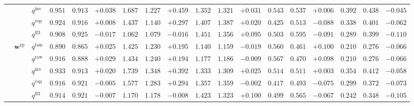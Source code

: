 \documentclass[eng]{kjas3}
\begin{document}
\begin{table}[t]
{\begin{tabular}{lll ccc ccc ccc ccc ccc}
 &  & $q^{\mathrm{inv}}$ & $0.951$ & $0.913$ & \cellcolor{posgreen!50}$+0.038$ & $1.687$ & $1.227$ & \cellcolor{posgreen!50}$+0.459$ & $1.352$ & $1.321$ & \cellcolor{posgreen!50}$+0.031$ & $0.543$ & $0.537$ & \cellcolor{posgreen!50}$+0.006$ & $0.392$ & $0.438$ & \cellcolor{negred!50}$-0.045$ \\
 &  & $q^{\mathrm{vsp}}$ & $0.924$ & $0.916$ & \cellcolor{posgreen!50}$+0.008$ & $1.437$ & $1.140$ & \cellcolor{posgreen!50}$+0.297$ & $1.407$ & $1.387$ & \cellcolor{posgreen!50}$+0.020$ & $0.425$ & $0.513$ & \cellcolor{negred!50}$-0.088$ & $0.338$ & $0.401$ & \cellcolor{negred!50}$-0.062$ \\
 &  & $q^{\mathrm{ff3}}$ & $0.908$ & $0.925$ & \cellcolor{negred!50}$-0.017$ & $1.062$ & $1.079$ & \cellcolor{negred!50}$-0.016$ & $1.451$ & $1.356$ & \cellcolor{posgreen!50}$+0.095$ & $0.503$ & $0.595$ & \cellcolor{negred!50}$-0.091$ & $0.289$ & $0.399$ & \cellcolor{negred!50}$-0.110$ \\
\cmidrule(lr){2-18}
 & $\mathbf{w}^{\mathrm{rp}}$ & $q^{\mathrm{lam}}$ & $0.890$ & $0.865$ & \cellcolor{posgreen!50}$+0.025$ & $1.425$ & $1.230$ & \cellcolor{posgreen!50}$+0.195$ & $1.140$ & $1.159$ & \cellcolor{negred!50}$-0.019$ & $0.560$ & $0.461$ & \cellcolor{posgreen!50}$+0.100$ & $0.210$ & $0.276$ & \cellcolor{negred!50}$-0.066$ \\
 &  & $q^{\mathrm{raw}}$ & $0.916$ & $0.888$ & \cellcolor{posgreen!50}$+0.029$ & $1.434$ & $1.240$ & \cellcolor{posgreen!50}$+0.194$ & $1.177$ & $1.186$ & \cellcolor{negred!50}$-0.009$ & $0.567$ & $0.470$ & \cellcolor{posgreen!50}$+0.098$ & $0.210$ & $0.276$ & \cellcolor{negred!50}$-0.066$ \\
 &  & $q^{\mathrm{inv}}$ & $0.933$ & $0.913$ & \cellcolor{posgreen!50}$+0.020$ & $1.739$ & $1.348$ & \cellcolor{posgreen!50}$+0.392$ & $1.333$ & $1.309$ & \cellcolor{posgreen!50}$+0.025$ & $0.514$ & $0.511$ & \cellcolor{posgreen!50}$+0.003$ & $0.354$ & $0.412$ & \cellcolor{negred!50}$-0.058$ \\
 &  & $q^{\mathrm{vsp}}$ & $0.916$ & $0.921$ & \cellcolor{negred!50}$-0.005$ & $1.577$ & $1.283$ & \cellcolor{posgreen!50}$+0.294$ & $1.357$ & $1.359$ & \cellcolor{negred!50}$-0.002$ & $0.417$ & $0.493$ & \cellcolor{negred!50}$-0.075$ & $0.299$ & $0.372$ & \cellcolor{negred!50}$-0.073$ \\
 &  & $q^{\mathrm{ff3}}$ & $0.914$ & $0.921$ & \cellcolor{negred!50}$-0.007$ & $1.170$ & $1.178$ & \cellcolor{negred!50}$-0.008$ & $1.423$ & $1.323$ & \cellcolor{posgreen!50}$+0.100$ & $0.499$ & $0.565$ & \cellcolor{negred!50}$-0.067$ & $0.242$ & $0.348$ & \cellcolor{negred!50}$-0.105$ \\
\bottomrule
\end{tabular}}
\end{table}
\end{document}
